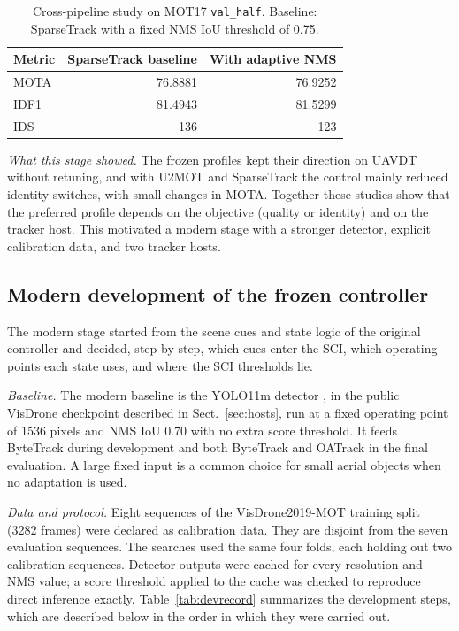 \documentclass[pdflatex,sn-mathphys-num,iicol]{sn-jnl}
\begin{document}
\begin{table}[t]
\caption{Cross-pipeline study on MOT17 \texttt{val\_half}. Baseline:
SparseTrack with a fixed NMS IoU threshold of 0.75.}
\label{tab:sparsetrack}
\centering\footnotesize
\setlength{\tabcolsep}{4pt}
\begin{tabular}{@{}lrr@{}}
\toprule
Metric & SparseTrack baseline & With adaptive NMS\\
\midrule
MOTA & 76.8881 & 76.9252\\
IDF1 & 81.4943 & 81.5299\\
IDS & 136 & 123\\
\bottomrule
\end{tabular}
\end{table}

\emph{What this stage showed.} The frozen profiles kept their direction on
UAVDT without retuning, and with U2MOT and SparseTrack the control mainly
reduced identity switches, with small changes in MOTA. Together these
studies show that the preferred profile depends on the objective (quality or
identity) and on the tracker host. This motivated a modern stage with a
stronger detector, explicit calibration data, and two tracker hosts.

\subsection{Modern development of the frozen controller}\label{sec:modern}

The modern stage started from the scene cues and state logic of the original
controller and decided, step by step, which cues enter the SCI, which
operating points each state uses, and where the SCI thresholds lie.

\emph{Baseline.} The modern baseline is the YOLO11m detector
\cite{jocher2024yolo11}, in the public VisDrone checkpoint described in
Sect.~\ref{sec:hosts}, run at a fixed operating point of 1536 pixels and NMS
IoU 0.70 with no extra score threshold. It feeds ByteTrack
\cite{zhang2022bytetrack} during development and both ByteTrack and OATrack
\cite{qi2026oatrack} in the final evaluation. A large fixed input is a common
choice for small aerial objects when no adaptation is used.

\emph{Data and protocol.} Eight sequences of the VisDrone2019-MOT training split
(3282 frames) were declared as calibration data. They are disjoint from the
seven evaluation sequences. The searches used the same four folds, each
holding out two calibration sequences. Detector outputs were cached for
every resolution and NMS value; a score threshold applied to the cache was
checked to reproduce direct inference exactly. Table~\ref{tab:devrecord}
summarizes the development steps, which are described below in the order in
which they were carried out.
\end{document}

